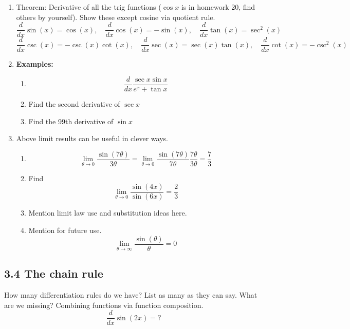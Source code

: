 \documentclass{article}
\begin{document}
\begin{enumerate}

\item Theorem: Derivative of all the trig functions ($\cos x$ is in homework 20, find others by yourself). Show these except cosine via quotient rule.
$$
\frac{d}{dx} \sin(x) = \cos(x), \quad
\frac{d}{dx} \cos(x) = -\sin(x), \quad
\frac{d}{dx} \tan(x) = \sec^2(x)
$$
$$
\frac{d}{dx} \csc(x) = -\csc(x)\cot(x), \quad
\frac{d}{dx} \sec(x) = \sec(x)\tan(x), \quad
\frac{d}{dx} \cot(x) = -\csc^2(x)
$$

\item {\bf Examples: }
\begin{enumerate}
\item $$\frac{d}{dx}\frac{\sec x\sin x}{e^x+\tan x}$$
\item Find the second derivative of $\sec x$\\
\item Find the 99th derivative of $\sin x$
\end{enumerate}

\item Above limit results can be useful in clever ways.
\begin{enumerate}
\item 
$$\lim_{\theta\rightarrow 0} \frac{\sin (7\theta)}{3\theta} = 
\lim_{\theta\rightarrow 0} \frac{\sin (7\theta)}{7\theta}\frac{7\theta}{3\theta} = \frac{7}{3}$$
\item Find 
$$\lim_{\theta\rightarrow 0} \frac{\sin(4x)}{\sin(6x)} = \frac{2}{3}$$
\item Mention limit law use and substitution ideas here.
\item Mention for future use.
$$\lim_{\theta\rightarrow \infty} \frac{\sin (\theta)}{\theta} = 0$$
\end{enumerate}
\end{enumerate}


\subsection{3.4 The chain rule}
How many differentiation rules do we have? List as many as they can say.
What are we missing? Combining functions via function composition.
$$
\frac{d}{dx}\sin(2x)=?
$$
\end{document}
